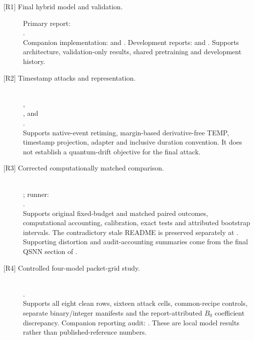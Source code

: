 \documentclass[10pt,onecolumn]{article}
\newcommand{\rref}[1]{\textup{[R#1]}}
\begin{document}
\begin{description}
\item[\rref{1} Final hybrid model and validation.] Primary report:\\
.\\
Companion implementation:  and . Development reports:  and . Supports architecture, validation-only results, shared pretraining and development history.

\item[\rref{2} Timestamp attacks and representation.]\mbox{}\\
,\\
, and\\
.\\
Supports native-event retiming, margin-based derivative-free TEMP, timestamp projection, adapter and inclusive duration convention. It does not establish a quantum-drift objective for the final attack.

\item[\rref{3} Corrected computationally matched comparison.]\mbox{}\\
; runner:\\
.\\
Supports original fixed-budget and matched paired outcomes, computational accounting, calibration, exact tests and attributed bootstrap intervals. The contradictory stale README is preserved separately at . Supporting distortion and audit-accounting summaries come from the final QSNN section of .

\item[\rref{4} Controlled four-model packet-grid study.]\mbox{}\\
.\\
Supports all eight clean rows, sixteen attack cells, common-recipe controls, separate binary/integer manifests and the report-attributed $B_0$ coefficient discrepancy. Companion reporting audit: . These are local model results rather than published-reference numbers.


\end{description}
\end{document}
